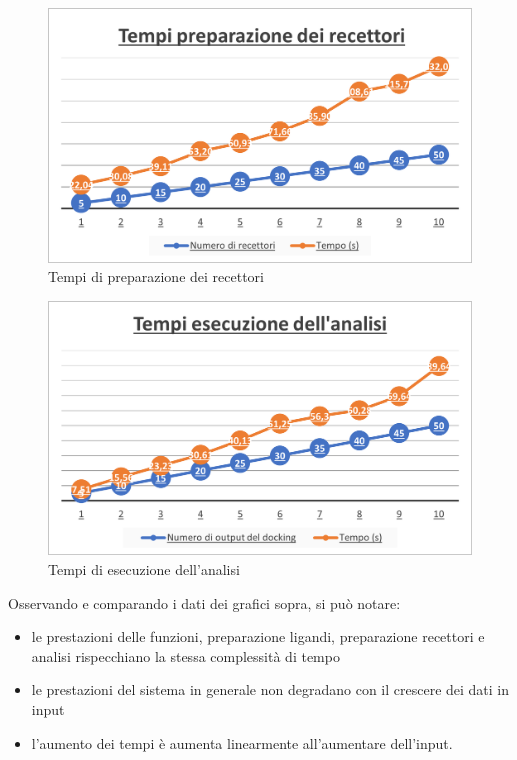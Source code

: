 \begin{figure}[H]
    \centering
    \includegraphics{immagini/capitolo4/tempiRecettori.png}
    \caption{Tempi di preparazione dei recettori}
    \label{fig:tempi recettori}
\end{figure}

\begin{figure}[H]
    \centering
    \includegraphics{immagini/capitolo4/tempiAnalisi.png}
    \caption{Tempi di esecuzione dell'analisi}
    \label{fig:tempi analisi}
\end{figure}

Osservando e comparando i dati dei grafici sopra, si può notare:

\begin{itemize}
    \item le prestazioni delle funzioni, preparazione ligandi, preparazione recettori e analisi rispecchiano la stessa complessità di tempo
    \item le prestazioni del sistema in generale non degradano con il crescere dei dati in input
    \item l'aumento dei tempi è aumenta linearmente all'aumentare dell'input.
\end{itemize}